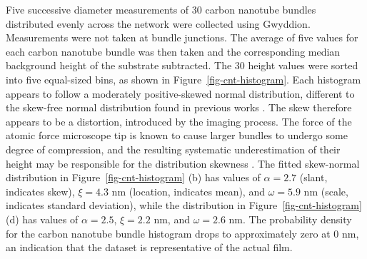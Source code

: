 \documentclass[
  a4paper,
]{scrbook}
\begin{document}
Five successive diameter measurements of 30 carbon nanotube bundles
distributed evenly across the network were collected using Gwyddion.
Measurements were not taken at bundle junctions. The average of five
values for each carbon nanotube bundle was then taken and the
corresponding median background height of the substrate subtracted. The
30 height values were sorted into five equal-sized bins, as shown in
Figure~\ref{fig-cnt-histogram}. Each histogram appears to follow a
moderately positive-skewed normal distribution, different to the
skew-free normal distribution found in previous works
\autocite{LeMieux2008,Liu2013,Vobornik2023}. The skew therefore appears
to be a distortion, introduced by the imaging process. The force of the
atomic force microscope tip is known to cause larger bundles to undergo
some degree of compression, and the resulting systematic underestimation
of their height may be responsible for the distribution skewness
\autocite{Vobornik2023}. The fitted skew-normal distribution in
Figure~\ref{fig-cnt-histogram} (b) has values of \(\alpha = 2.7\)
(slant, indicates skew), \(\xi = 4.3\) nm (location, indicates mean),
and \(\omega = 5.9\) nm (scale, indicates standard deviation), while the
distribution in Figure~\ref{fig-cnt-histogram} (d) has values of
\(\alpha = 2.5\), \(\xi = 2.2\) nm, and \(\omega = 2.6\) nm. The
probability density for the carbon nanotube bundle histogram drops to
approximately zero at 0 nm, an indication that the dataset is
representative of the actual film.
\end{document}
